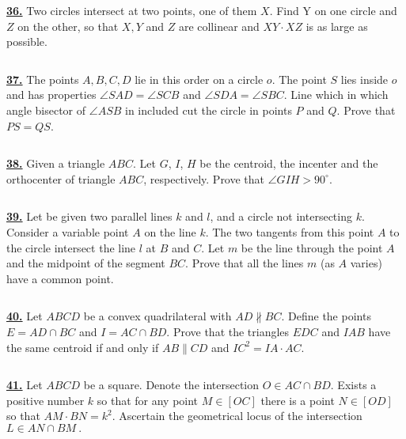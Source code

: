 \documentclass{article}
\begin{document}
$$ $$

\href{http://www.artofproblemsolving.com/Forum/viewtopic.php?p=659219#p659219
 }{\bf 36.} Two circles intersect at two points, one of them $X.$ Find Y on one circle and $Z$ on the other, so that $X, Y$ and $Z$ are collinear and $XY \cdot XZ$ is as large as possible.



$$ $$

\href{http://www.artofproblemsolving.com/Forum/viewtopic.php?p=337819#p337819
 }{\bf 37.} The points $A, B, C, D$ lie in this order on a circle $o$.  The point $S$ lies inside $o$ and has properties $\angle SAD=\angle SCB$ and $\angle SDA= \angle SBC$. Line which in which angle bisector of $\angle ASB$ in included cut the circle in points  $P$ and $Q$. Prove that $PS =QS$.



$$ $$

\href{ http://www.artofproblemsolving.com/Forum/viewtopic.php?p=246214#p246214
}{\bf 38.} Given a triangle $ ABC$. Let $ G$, $ I$, $ H$ be the centroid, the incenter and the orthocenter of triangle $ ABC$, respectively. Prove that $ \angle GIH > 90^{\circ}$.


$$ $$


\href{http://www.artofproblemsolving.com/Forum/viewtopic.php?p=342752#p342752
 }{\bf 39.} Let be given two parallel lines $k$ and $l$, and a circle not intersecting $k$. Consider a variable point $A$ on the line $k$. The two tangents from this point $A$ to the circle intersect the line $l$ at $B$ and $C$. Let $m$ be the line through the point $A$ and the midpoint of the segment $BC$. Prove that all the lines $m$ (as $A$ varies) have a common point.

$$ $$



\href{http://www.artofproblemsolving.com/Forum/viewtopic.php?p=198163#p198163
 }{\bf 40.} Let $ABCD$ be a convex quadrilateral with $AD\not\parallel BC$. Define the points $E=AD \cap BC$ and $I = AC\cap BD$. Prove that the triangles $EDC$ and $IAB$ have the same centroid if and only if $AB \parallel CD$ and $IC^{2}= IA \cdot AC$.


$$ $$


\href{http://www.artofproblemsolving.com/Forum/viewtopic.php?p=578901#p578901
 }{\bf 41.} Let $ABCD$ be a square. Denote the intersection $O\in AC\cap BD$. Exists a positive number $k$ so that for any point $M\in [OC]$ there is a point $N\in [OD]$ so that $AM\cdot BN=k^{2}$. Ascertain the geometrical locus of the intersection $L\in AN\cap BM\ .$
\end{document}
